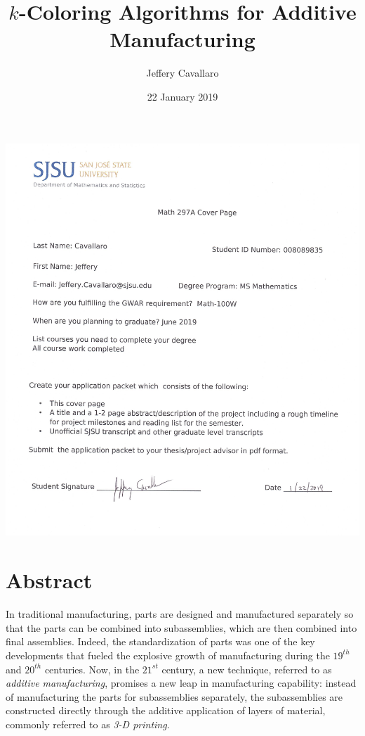 \documentclass[letterpaper,12pt]{article}
\begin{document}
\includegraphics[scale=0.9]{Cavallaro-297A-CoverPage.jpg}

\title{\(k\)-Coloring Algorithms for Additive Manufacturing}
\author{Jeffery Cavallaro}
\date{22 January 2019}
\maketitle
\section*{Abstract}
In traditional manufacturing, parts are designed and manufactured separately so that the parts can be combined into
subassemblies, which are then combined into final assemblies.  Indeed, the standardization of parts was one of the key
developments that fueled the explosive growth of manufacturing during the \(19^{th}\) and \(20^{th}\) centuries.  Now, in the
\(21^{st}\) century, a new technique, referred to as \emph{additive manufacturing}, promises a new leap in manufacturing
capability: instead of manufacturing the parts for subassemblies separately, the subassemblies are constructed directly
through the additive application of layers of material, commonly referred to as \emph{3-D printing}.
\end{document}
